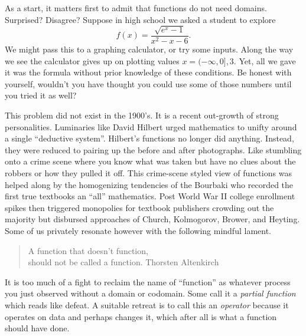 As a start, it matters first to admit that functions do not need 
domains.  Surprised? Disagree?    Suppose in high school we asked 
a student to  explore
\[
    f(x) = \frac{\sqrt{e^x-1}}{x^2-x-6}.
\]
We might pass this to a graphing calculator, or try some inputs. Along the way
we see the calculator gives up on plotting values $x=(-\infty,0],3$.  Yet, all
we gave it was the formula without prior knowledge of these conditions.  
Be honest with yourself, wouldn't you have thought you could use some of 
those numbers until you tried it as well?  

This problem did not exist in the 1900's.  It is a recent out-growth of strong
personalities.  Luminaries like David Hilbert urged mathematics to unifty around
a single ``deductive system''.  Hilbert's functions no longer did anything.
Instead, they were reduced to pairing up the before and after photographs.  Like
stumbling onto a crime scene where you know what was taken but have no clues
about the robbers or how they pulled it off.  This crime-scene styled view of
functions was helped along by the homogenizing tendencies of the Bourbaki who
recorded the first true textbooks an ``all'' mathematics. Post World War II
college enrollment spikes then triggered monopolies for textbook publishers
crowding out the majority but disbursed approaches of Church, Kolmogorov,
Brower, and Heyting.  Some of us privately resonate however with the following mindful
lament.
\begin{quote}
    A function that doesn't function,\\
    should not be called a function.
    \hfill Thorsten Altenkirch
\end{quote}

It is too much of a fight to reclaim the 
name of ``function'' as whatever process you just observed without a domain 
or codomain.  Some call it a \emph{partial function} which reads like defeat.
A suitable retreat is to call this an \emph{operator} because 
it operates on data and perhaps changes it, which after all is what a function should have done.

